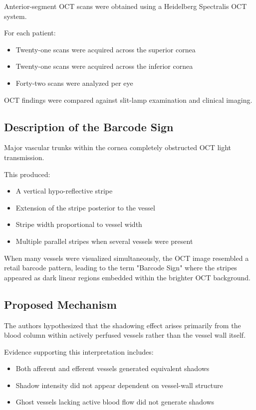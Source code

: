 \documentclass[11pt]{article}
\begin{document}
Anterior-segment OCT scans were obtained using a Heidelberg Spectralis OCT system.

For each patient:

\begin{itemize}
    \item Twenty-one scans were acquired across the superior cornea
    \item Twenty-one scans were acquired across the inferior cornea
    \item Forty-two scans were analyzed per eye
\end{itemize}

OCT findings were compared against slit-lamp examination and clinical imaging.

\subsection*{Description of the Barcode Sign}

Major vascular trunks within the cornea completely obstructed OCT light transmission.

This produced:

\begin{itemize}
    \item A vertical hypo-reflective stripe
    \item Extension of the stripe posterior to the vessel
    \item Stripe width proportional to vessel width
    \item Multiple parallel stripes when several vessels were present
\end{itemize}

When many vessels were visualized simultaneously, the OCT image resembled a retail barcode pattern, leading to the term "Barcode Sign" where the stripes appeared as dark linear regions embedded within the brighter OCT background.

\subsection*{Proposed Mechanism}

The authors hypothesized that the shadowing effect arises primarily from the blood column within actively perfused vessels rather than the vessel wall itself.

Evidence supporting this interpretation includes:

\begin{itemize}
    \item Both afferent and efferent vessels generated equivalent shadows
    \item Shadow intensity did not appear dependent on vessel-wall structure
    \item Ghost vessels lacking active blood flow did not generate shadows
\end{itemize}
\end{document}
